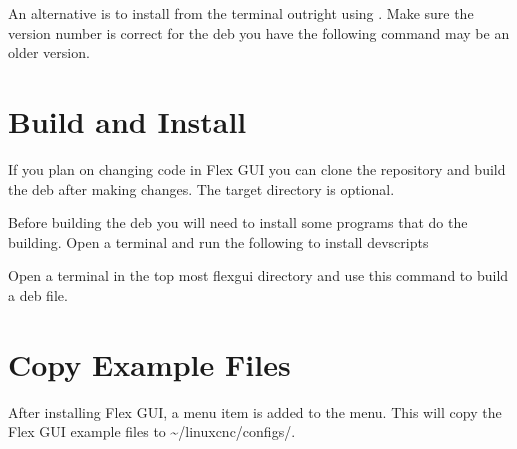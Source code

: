 \documentclass[letterpaper,10pt,english]{sphinxmanual}
\begin{document}
\sphinxAtStartPar
An alternative is to install from the terminal outright using . Make sure
the version number is correct for the deb you have the following command may be
an older version.

\begin{sphinxVerbatim}[commandchars=\\\{\}]
   
\end{sphinxVerbatim}


\section{Build and Install}
\label{\detokenize{install:build-and-install}}\label{\detokenize{install:install-build}}
\sphinxAtStartPar
If you plan on changing code in Flex GUI you can clone the repository and build
the deb after making changes. The target directory is optional.

\begin{sphinxVerbatim}[commandchars=\\\{\}]
   
\end{sphinxVerbatim}

\sphinxAtStartPar
Before building the deb you will need to install some programs that do the
building. Open a terminal and run the following to install devscripts

\begin{sphinxVerbatim}[commandchars=\\\{\}]
   
\end{sphinxVerbatim}

\sphinxAtStartPar
Open a terminal in the top most flexgui directory and use this command to build
a deb file.

\begin{sphinxVerbatim}[commandchars=\\\{\}]
  
\end{sphinxVerbatim}


\section{Copy Example Files}
\label{\detokenize{install:copy-example-files}}\label{\detokenize{install:copy-examples}}
\sphinxAtStartPar
After installing Flex GUI, a menu item  is added to the
 menu. This will copy the Flex GUI example files to
\textasciitilde{}/linuxcnc/configs/.
\end{document}
